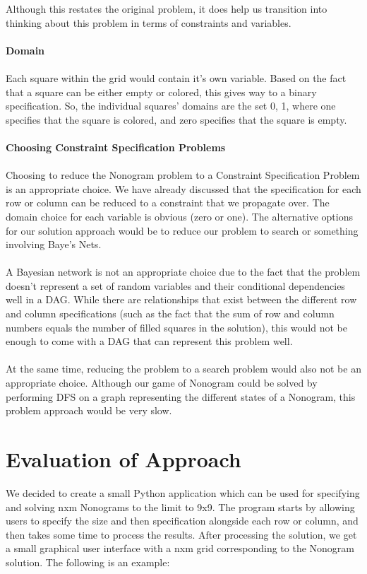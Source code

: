\documentclass[titlepage]{article}
\begin{document}
Although this restates the original problem, it does help us transition into thinking about this problem in terms of constraints and variables. \\\\
\textbf{Domain} \\\\
Each square within the grid would contain it's own variable. Based on the fact that a square can be either empty or colored, this gives way to a binary specification. So, the individual squares' domains are the set {0, 1}, where one specifies that the square is colored, and zero specifies that the square is empty.\\\\
\textbf{Choosing Constraint Specification Problems} \\\\
Choosing to reduce the Nonogram problem to a Constraint Specification Problem is an appropriate choice.
We have already discussed that the specification for each row or column can be reduced to a constraint that we propagate over. The domain choice for each variable is obvious (zero or one). The alternative options for our solution
approach would be to reduce our problem to search or something involving
Baye's Nets. \\\\
A Bayesian network is not an appropriate choice due to the fact
that the problem doesn't represent a set of random variables and their
conditional dependencies well in a DAG. While there are relationships that
exist between the different row and column specifications (such as the
fact that the sum of row and column numbers equals the number of filled squares in the solution), this would not be enough to come with a DAG that
can represent this problem well. \\\\
At the same time, reducing the problem to a search problem would also
not be an appropriate choice. Although our game of Nonogram could be
solved by performing DFS on a graph representing the different states of
a Nonogram, this problem approach would be very slow.

\section{Evaluation of Approach}
We decided to create a small Python application which can be used for specifying and solving nxm Nonograms to the limit to 9x9. The program starts by allowing users to specify the size and then specification alongside each row or column, and then takes some time to process the results. After processing the solution, we get a small graphical user interface with a nxm grid corresponding to the Nonogram solution. The following is an example:
\end{document}
